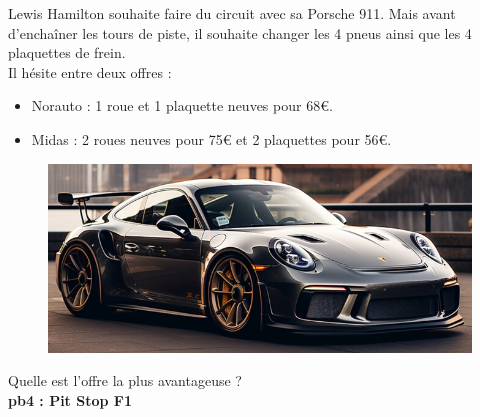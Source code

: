 \begin{multicols}{2} 
  Lewis Hamilton souhaite faire du circuit avec sa Porsche 911. Mais avant d'enchaîner les tours de piste, il souhaite changer les 4 pneus ainsi que les 4 plaquettes de frein. \\

  Il hésite entre deux offres : 

  \begin{itemize}[label={$\bullet$}]
    \item Norauto : 1 roue et 1 plaquette neuves pour 68€.
    \item Midas : 2 roues neuves pour 75€ et 2 plaquettes pour 56€. 
  \end{itemize} \columnbreak

  \begin{figure}[H]
    \centering
    \includegraphics[width=0.9\linewidth]{5x2-inegalite-triangulaire/porsche.png}
  \end{figure} 
\end{multicols}

Quelle est l'offre la plus avantageuse ?\\

\textbf{pb4 : Pit Stop F1} \\

